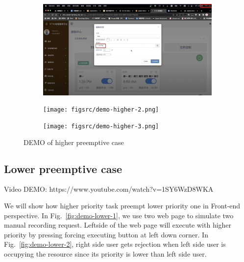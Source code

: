 \begin{figure}[H]
    \centering
    \begin{subfigure}{\textwidth}
        \includegraphics[width=\textwidth]{figsrc/demo-higher-1.png}
        \label{fig:demo-higher-1}
    \end{subfigure}
\end{figure}

\begin{figure}[H]
    \ContinuedFloat
    \centering
    \begin{subfigure}{\textwidth}
        \texttt{[image: figsrc/demo-higher-2.png]}
        \label{fig:demo-higher-2}
    \end{subfigure}
\end{figure}

\begin{figure}[H]
    \ContinuedFloat
    \centering
    \begin{subfigure}{\textwidth}
        \texttt{[image: figsrc/demo-higher-3.png]}
        \label{fig:demo-higher-3}
    \end{subfigure}

    \caption{DEMO of higher preemptive case}
    \label{fig:demo-higher}
\end{figure}

\subsection{Lower preemptive case}
Video DEMO: https://www.youtube.com/watch?v=1SY6WzD8WKA

We will show how higher priority task preempt lower priority one in Front-end perspective. In Fig.~\ref{fig:demo-lower-1}, we use two web page to simulate two manual recording request. Leftside of the web page will execute with higher priority by pressing forcing executing button at left down corner. In Fig.~\ref{fig:demo-lower-2}, right side user gets rejection when left side user is occupying the resource since its priority is lower than left side user.

